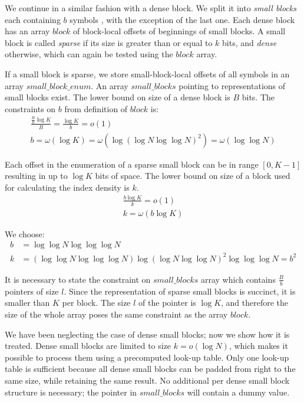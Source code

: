 We continue in a similar fashion with a dense block.
We split it into \emph{small blocks} each containing $b$ symbols \ph, with the exception of the last one.
Each dense block has an array $block$ of block-local offsets of beginnings of small blocks.
A small block is called \emph{sparse} if its size is greater than or equal to $k$ bits, and \emph{dense} otherwise, which can again be tested using the $block$ array.

If a small block is sparse, we store small-block-local offsets of all symbols \ph{} in an array $small\_block\_enum$.
An array $small\_blocks$ pointing to representations of small blocks exist.
The lower bound on size of a dense block is $B$ bits.
The constraints on $b$ from definition of $block$ is:
\begin{gather*}
\frac{\frac{B}{b} \log K}{B} = \frac{\log K}{b} = o(1) \\
b = \omega(\log K) = \omega(\log(\log N \log \log N)^2) = \omega(\log \log N)
\end{gather*}

Each offset in the enumeration of a sparse small block can be in range $[0, K-1]$ resulting in up to $\log K$ bits of space.
The lower bound on size of a block used for calculating the index density is $k$.
\begin{gather*}
\frac{b \log K}{k} = o(1) \\
k = \omega(b\log K)
\end{gather*}

We choose:
\begin{align*}
b &= \log \log N \log \log \log N \\
k &= (\log \log N \log \log \log N) \log(\log N \log \log N)^2 \log \log \log N = b^2
\end{align*}

It is necessary to state the constraint on $small\_blocks$ array which contains $\frac{B}{b}$ pointers of size $l$.
Since the representation of sparse small blocks is succinct, it is smaller than $K$ per block.
The size $l$ of the pointer is $\log K$, and therefore the size of the whole array poses the same constraint as the array $block$.

We have been neglecting the case of dense small blocks; now we show how it is treated.
Dense small blocks are limited to size $k = o(\log N)$, which makes it possible to process them using a precomputed look-up table.
Only one look-up table is sufficient because all dense small blocks can be padded from right to the same size, while retaining the same result.
No additional per dense small block structure is necessary; the pointer in $small\_blocks$ will contain a dummy value.

